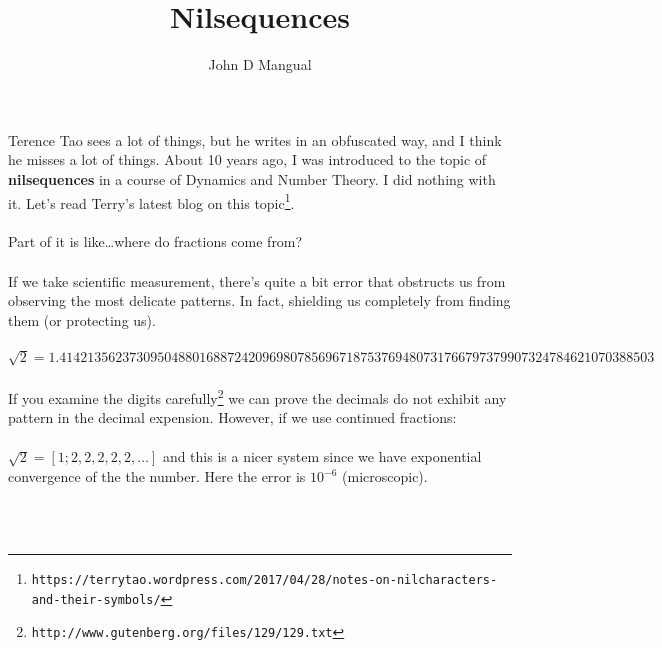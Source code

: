 \documentclass[12pt]{article}
\title{Nilsequences}
\author{John D Mangual}
\date{}
\begin{document}
\selectfont \fontsize{12.5}{15}\selectfont

\maketitle

\noindent Terence Tao sees a lot of things, but he writes in an obfuscated way, and I think he misses a lot of things.  About 10 years ago, I was introduced to the topic of \textbf{nilsequences} in a course of Dynamics and Number Theory.  I did nothing with it.  Let's read Terry's latest blog on this topic\footnote{\texttt{https://terrytao.wordpress.com/2017/04/28/notes-on-nilcharacters-and-their-symbols/}}. \\ \\
Part of it is like\dots where do fractions come from?  \\ \\
If we take scientific measurement, there's quite a bit error that obstructs us from observing the most delicate patterns.  In fact, shielding us completely from finding them (or protecting us). \\ \\
$\sqrt{2} = 1.414213562373095048801688724209698078
5696718753769480731766797379907324784621070388503 $ \\ \\
If you examine the digits carefully\footnote{\texttt{http://www.gutenberg.org/files/129/129.txt}} we can prove the decimals do not exhibit any pattern in the decimal expension.  However, if we use continued fractions: \\ \\
$\sqrt{2} = [1; 2,2,2,2,2 , \dots ] $
and this is a nicer system since we have exponential convergence of the the number.  Here the error is $10^{-6}$ (microscopic). \\ \\
 \\
\end{document}
